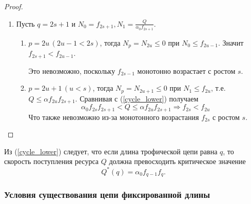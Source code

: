 \begin{proof}
\begin{enumerate}
                \item Пусть \( q = 2s+1 \) и \( N_0 = f_{2s+1}, N_1 = \frac{Q}{\alpha_0 f_{2s+1}}\).
                \begin{enumerate}
                    \item \(p = 2u \, (2u-1 < 2s)\), тогда \( N_p = N_{2u} \leq 0 \) при \(N_0 \leq f_{2u-1}\). Значит \(f_{2s+1} < f_{2u-1} \). 
                    
                    Это невозможно, поскольку \(f_{2s-1}\) монотонно возрастает с ростом \(s\).

                    \item \(p = 2u+1 \, (u < s)\), тогда \( N_p = N_{2u+1} \leq 0 \) при \(N_1 \leq f_{2u}\), т.е. \( Q \leq \alpha f_{2u} f_{2s+1} \). Сравнивая с (\ref{cycle_lower}) получаем
                    \begin{equation*}
                        \alpha_0 f_{2s} f_{2s+1} < Q \leq \alpha f_{2u} f_{2s+1} \Rightarrow f_{2s} < f_{2u}
                    \end{equation*}
                    Что также невозможно из-за монотонного возрастания \(f_{2s}\) с ростом \(s\). 
                \end{enumerate}
            \end{enumerate}
        \end{proof}

        \begin{corollary}
            Из (\ref{cycle_lower}) следует, что если длина трофической цепи равна \(q\), то скорость поступления ресурса \( Q \) должна превосходить критическое значение 
            \begin{equation*}
                Q^* (q) = \alpha_0 f_{q-1} f_{q}.
            \end{equation*}
        \end{corollary}
        

        \subsubsection{Условия существования цепи фиксированной длины}


